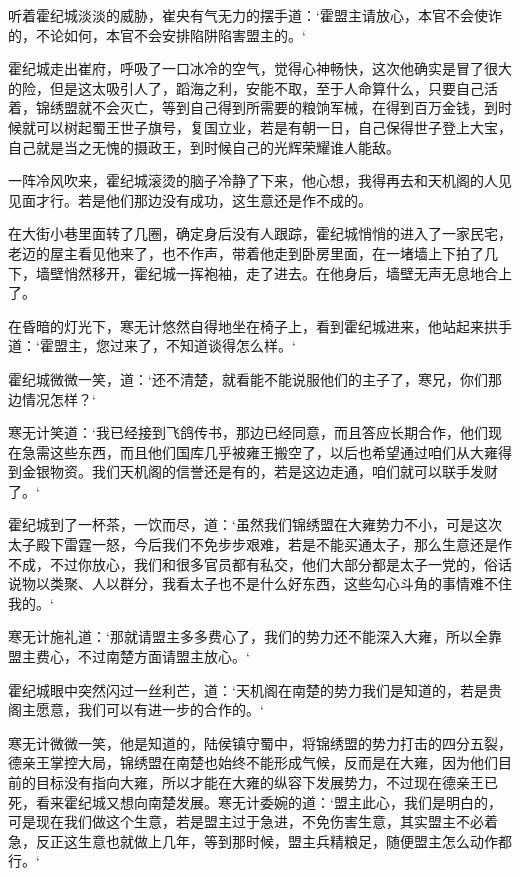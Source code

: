 听着霍纪城淡淡的威胁，崔央有气无力的摆手道：‘霍盟主请放心，本官不会使诈的，不论如何，本官不会安排陷阱陷害盟主的。‘

霍纪城走出崔府，呼吸了一口冰冷的空气，觉得心神畅快，这次他确实是冒了很大的险，但是这太吸引人了，蹈海之利，安能不取，至于人命算什么，只要自己活着，锦绣盟就不会灭亡，等到自己得到所需要的粮饷军械，在得到百万金钱，到时候就可以树起蜀王世子旗号，复国立业，若是有朝一日，自己保得世子登上大宝，自己就是当之无愧的摄政王，到时候自己的光辉荣耀谁人能敌。

一阵冷风吹来，霍纪城滚烫的脑子冷静了下来，他心想，我得再去和天机阁的人见见面才行。若是他们那边没有成功，这生意还是作不成的。

在大街小巷里面转了几圈，确定身后没有人跟踪，霍纪城悄悄的进入了一家民宅，老迈的屋主看见他来了，也不作声，带着他走到卧房里面，在一堵墙上下拍了几下，墙壁悄然移开，霍纪城一挥袍袖，走了进去。在他身后，墙壁无声无息地合上了。

在昏暗的灯光下，寒无计悠然自得地坐在椅子上，看到霍纪城进来，他站起来拱手道：‘霍盟主，您过来了，不知道谈得怎么样。‘

霍纪城微微一笑，道：‘还不清楚，就看能不能说服他们的主子了，寒兄，你们那边情况怎样？‘

寒无计笑道：‘我已经接到飞鸽传书，那边已经同意，而且答应长期合作，他们现在急需这些东西，而且他们国库几乎被雍王搬空了，以后也希望通过咱们从大雍得到金银物资。我们天机阁的信誉还是有的，若是这边走通，咱们就可以联手发财了。‘

霍纪城到了一杯茶，一饮而尽，道：‘虽然我们锦绣盟在大雍势力不小，可是这次太子殿下雷霆一怒，今后我们不免步步艰难，若是不能买通太子，那么生意还是作不成，不过你放心，我们和很多官员都有私交，他们大部分都是太子一党的，俗话说物以类聚、人以群分，我看太子也不是什么好东西，这些勾心斗角的事情难不住我的。‘

寒无计施礼道：‘那就请盟主多多费心了，我们的势力还不能深入大雍，所以全靠盟主费心，不过南楚方面请盟主放心。‘

霍纪城眼中突然闪过一丝利芒，道：‘天机阁在南楚的势力我们是知道的，若是贵阁主愿意，我们可以有进一步的合作的。‘

寒无计微微一笑，他是知道的，陆侯镇守蜀中，将锦绣盟的势力打击的四分五裂，德亲王掌控大局，锦绣盟在南楚也始终不能形成气候，反而是在大雍，因为他们目前的目标没有指向大雍，所以才能在大雍的纵容下发展势力，不过现在德亲王已死，看来霍纪城又想向南楚发展。寒无计委婉的道：‘盟主此心，我们是明白的，可是现在我们做这个生意，若是盟主过于急进，不免伤害生意，其实盟主不必着急，反正这生意也就做上几年，等到那时候，盟主兵精粮足，随便盟主怎么动作都行。‘

